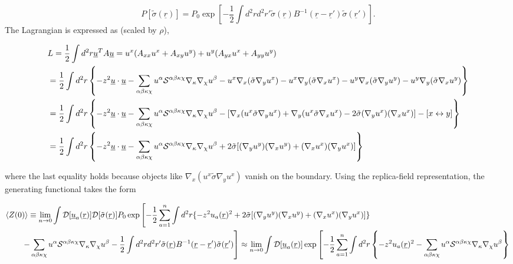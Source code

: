 \documentclass[twoside,twocolumn,9pt]{article}
\begin{document}
\begin{appendix}
\begin{equation}
P[\tilde{\sigma}(\underline{r})]=P_0\exp\left[-\frac{1}{2}\int d^2rd^2r'\tilde{\sigma}(\underline{r})B^{-1}(\underline{r}-\underline{r}')\tilde{\sigma}(\underline{r}')\right].
\end{equation}
The Lagrangian is expressed as (scaled by $\rho$),
\begin{strip}
\begin{align}
&L=\frac{1}{2}\int d^2r\underline{u}^TA\underline{u}=u^x(A_{xx}u^x+A_{xy}u^y)+u^y(A_{yx}u^x+A_{yy}u^y)\notag\\
&=\frac{1}{2}\int d^2r\left\{-z^2\underline{u}\cdot\underline{u}-\sum_{\alpha\beta\kappa\chi}u^\alpha \mathcal{S}^{\alpha\beta\kappa\chi}\nabla_\kappa\nabla_\chi u^\beta-u^x\nabla_x(\tilde{\sigma}\nabla_y u^x)-u^x\nabla_y(\tilde{\sigma}\nabla_xu^x)-u^y\nabla_x(\tilde{\sigma}\nabla_yu^y)-u^y\nabla_y(\tilde{\sigma}\nabla_xu^y)\right\}\notag\\
&=\frac{1}{2}\int d^2r\left\{-z^2\underline{u}\cdot\underline{u}-\sum_{\alpha\beta\kappa\chi}u^\alpha \mathcal{S}^{\alpha\beta\kappa\chi}\nabla_\kappa\nabla_\chi u^\beta-[\nabla_x(u^x\tilde{\sigma}\nabla_yu^x)
+\nabla_y(u^x\tilde{\sigma}\nabla_xu^x)-2\tilde{\sigma}(\nabla_yu^x)(\nabla_xu^x)]-[x\leftrightarrow y]\right\}\notag\\
&=\frac{1}{2}\int d^2r\left\{-z^2\underline{u}\cdot\underline{u}-\sum_{\alpha\beta\kappa\chi}u^\alpha \mathcal{S}^{\alpha\beta\kappa\chi}\nabla_\kappa\nabla_\chi u^\beta+2\tilde{\sigma}[(\nabla_yu^y)(\nabla_xu^y)+(\nabla_xu^x)(\nabla_yu^x)]\right\}
\end{align}
\end{strip}
where the last equality holds because objects like $\nabla_x(u^x\tilde{\sigma}\nabla_yu^x)$ vanish on the boundary. Using the replica-field representation, the generating functional takes the form
\begin{strip}
\begin{align}
&\langle Z(0)\rangle\equiv
\lim_{n\rightarrow0}\int\mathcal{D}[\underline{u}_a(\underline{r})]\mathcal{D}[\tilde{\sigma}(\underline{r})]P_0\exp\left[-\frac{1}{2}\sum_{a=1}^n\int d^2r\{{-z^2u_a(\underline{r})^2+2\tilde{\sigma}[(\nabla_yu^y)(\nabla_xu^y)+(\nabla_xu^x)(\nabla_yu^x)]\}}\right.\notag\\
&\qquad\left.{-\sum_{\alpha\beta\kappa\chi}u^\alpha \mathcal{S}^{\alpha\beta\kappa\chi}\nabla_\kappa\nabla_\chi u^\beta-\frac{1}{2}\int d^2rd^2r'\tilde{\sigma}(\underline{r})B^{-1}(\underline{r}-\underline{r}')\tilde{\sigma}(\underline{r}')}\right]\approx\lim_{n\rightarrow0}\int\mathcal{D}[\underline{u}_a(\underline{r})]\exp\left[{-\frac{1}{2}\sum_{a=1}^n\int d^2r\left\{-z^2u_a(\underline{r})^2-\sum_{\alpha\beta\kappa\chi}u^\alpha \mathcal{S}^{\alpha\beta\kappa\chi}\nabla_\kappa\nabla_\chi u^\beta\right\}}\right.\notag\\

\end{align}
\end{strip}
\end{appendix}
\end{document}
